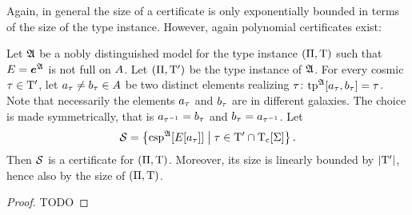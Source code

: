 Again, in general the size of a certificate is only exponentially bounded in
terms of the size of the type instance. However, again polynomial certificates
exist:
\begin{lemma}\label{lem:cert-extr-many}
Let $\mathfrak{A}$ be a nobly distinguished model for the type instance
$(\Pi,\mathrm{T})$ such that $E = \bm{e}^{\mathfrak{A}}$ is not full on $A$.
Let $(\Pi,{\mathrm{T}'})$ be the type instance of $\mathfrak{A}$. For every cosmic $\tau
\in {\mathrm{T}'}$, let $a_{\tau} \neq b_{\tau} \in A$ be two distinct elements
realizing $\tau$: $\operatorname{tp}^{\mathfrak{A}}[a_{\tau},b_{\tau}] = \tau$. Note that
necessarily the elements $a_{\tau}$ and $b_{\tau}$ are in different galaxies.
The choice is made symmetrically, that is $a_{\tau^{-1}} = b_{\tau}$ and
$b_{\tau} = a_{\tau^{-1}}$. Let
\[
  \mathcal{S} = \left\{\operatorname{csp}^{\mathfrak{A}}[E[a_{\tau}]]\mathrel{}\middle|\mathrel{}\tau \in {\mathrm{T}'} \cap
  \mathrm{T}_{\mathrm{c}}[\mathrm{\Sigma}]\right\}.
\]
Then $\mathcal{S}$ is a certificate for $(\Pi,\mathrm{T})$.
Moreover, its size is linearly bounded by $\left|{\mathrm{T}'}\right|$, hence also by the size
of $(\Pi,\mathrm{T})$.
\end{lemma}
\begin{proof}
TODO
\end{proof}
